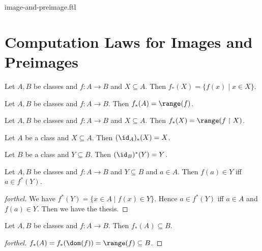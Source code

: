 \documentclass{naproche-library}
\begin{document}
\begin{smodule}{image-and-preimage.ftl}

  \section*{Computation Laws for Images and Preimages}

  \begin{proposition}[forthel,id=FOUNDATIONS_07_5919649206108160]
    Let $A, B$ be classes and $f : A \to B$ and $X \subseteq A$.
    Then $f_{*}(X) = \{ f(x) \mid x \in X \}$.
  \end{proposition}

  \begin{corollary}[forthel,id=FOUNDATIONS_07_5543924730953728]
    Let $A, B$ be classes and $f : A \to B$.
    Then $f_{*}(A) = \range(f)$.
  \end{corollary}

  \begin{corollary}[forthel,id=FOUNDATIONS_07_1818812171157504]
    Let $A, B$ be classes and $f : A \to B$ and $X \subseteq A$.
    Then $f_{*}(X) = \range(f \restriction X)$.
  \end{corollary}

  \begin{proposition}[forthel,id=FOUNDATIONS_07_911395830890496]
    Let $A$ be a class and $X \subseteq A$.
    Then $(\id_{A})_{*}(X) = X$.
  \end{proposition}

  \begin{proposition}[forthel,id=FOUNDATIONS_07_3349817830932480]
    Let $B$ be a class and $Y \subseteq B$.
    Then $(\id_{B})^{*}(Y) = Y$.
  \end{proposition}

  \begin{proposition}[forthel,id=FOUNDATIONS_07_6362984433582080]
    Let $A, B$ be classes and $f : A \to B$ and $Y \subseteq B$ and $a \in A$.
    Then $f(a) \in Y$ iff $a \in f^{*}(Y)$.
  \end{proposition}
  \begin{proof}[forthel]
    We have $f^{*}(Y) = \{ x \in A \mid f(x) \in Y \}$.
    Hence $a \in f^{*}(Y)$ iff $a \in A$ and $f(a) \in Y$.
    Then we have the thesis.
  \end{proof}

  \begin{proposition}[forthel,id=FOUNDATIONS_07_6730546254184448]
    Let $A, B$ be classes and $f : A \to B$.
    Then $f_{*}(A) \subseteq B$.
  \end{proposition}
  \begin{proof}[forthel]
    $f_{*}(A)
      = f_{*}(\dom(f))
      = \range(f)
      \subseteq B$.
  \end{proof}


\end{smodule}
\end{document}
